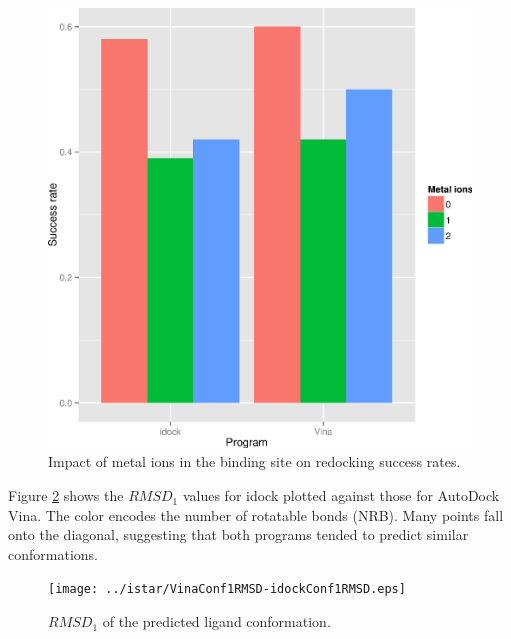 \begin{figure}
\begin{center}
\includegraphics[width=\linewidth]{../istar/Program-NIONS.eps}
\end{center}
\caption{Impact of metal ions in the binding site on redocking success rates.}
\label{istar:Program-NIONS}
\end{figure}

Figure \ref{istar:VinaConf1RMSD-idockConf1RMSD} shows the $RMSD_1$ values for idock plotted against those for AutoDock Vina. The color encodes the number of rotatable bonds (NRB). Many points fall onto the diagonal, suggesting that both programs tended to predict similar conformations.

\begin{figure}
\begin{center}
\texttt{[image: ../istar/VinaConf1RMSD-idockConf1RMSD.eps]}
\end{center}
\caption{$RMSD_1$ of the predicted ligand conformation.}
\label{istar:VinaConf1RMSD-idockConf1RMSD}
\end{figure}

